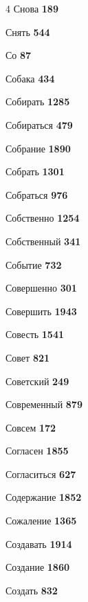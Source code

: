 \begin{multicols}{4}
\noindent Снова \dotfill \textbf{\color{secondary} 189}\par
\noindent Снять \dotfill \textbf{\color{secondary} 544}\par
\noindent Со \dotfill \textbf{\color{secondary} 87}\par
\noindent Собака \dotfill \textbf{\color{secondary} 434}\par
\noindent Собирать \dotfill \textbf{\color{secondary} 1285}\par
\noindent Собираться \dotfill \textbf{\color{secondary} 479}\par
\noindent Собрание \dotfill \textbf{\color{secondary} 1890}\par
\noindent Собрать \dotfill \textbf{\color{secondary} 1301}\par
\noindent Собраться \dotfill \textbf{\color{secondary} 976}\par
\noindent Собственно \dotfill \textbf{\color{secondary} 1254}\par
\noindent Собственный \dotfill \textbf{\color{secondary} 341}\par
\noindent Событие \dotfill \textbf{\color{secondary} 732}\par
\noindent Совершенно \dotfill \textbf{\color{secondary} 301}\par
\noindent Совершить \dotfill \textbf{\color{secondary} 1943}\par
\noindent Совесть \dotfill \textbf{\color{secondary} 1541}\par
\noindent Совет \dotfill \textbf{\color{secondary} 821}\par
\noindent Советский \dotfill \textbf{\color{secondary} 249}\par
\noindent Современный \dotfill \textbf{\color{secondary} 879}\par
\noindent Совсем \dotfill \textbf{\color{secondary} 172}\par
\noindent Согласен \dotfill \textbf{\color{secondary} 1855}\par
\noindent Согласиться \dotfill \textbf{\color{secondary} 627}\par
\noindent Содержание \dotfill \textbf{\color{secondary} 1852}\par
\noindent Сожаление \dotfill \textbf{\color{secondary} 1365}\par
\noindent Создавать \dotfill \textbf{\color{secondary} 1914}\par
\noindent Создание \dotfill \textbf{\color{secondary} 1860}\par
\noindent Создать \dotfill \textbf{\color{secondary} 832}\par

\end{multicols}

